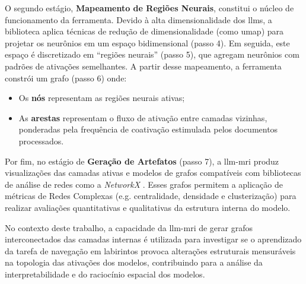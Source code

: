 O segundo estágio, \textbf{Mapeamento de Regiões Neurais}, constitui o núcleo de funcionamento da ferramenta. Devido à alta dimensionalidade dos \gls{llms}, a biblioteca aplica técnicas de redução de dimensionalidade (como \gls{umap}) para projetar os neurônios em um espaço bidimensional (passo 4). Em seguida, este espaço é discretizado em ``regiões neurais'' (passo 5), que agregam neurônios com padrões de ativações semelhantes. A partir desse mapeamento, a ferramenta constrói um grafo (passo 6) onde:

\begin{itemize}
    \item Os \textbf{nós} representam as regiões neurais ativas;
    \item As \textbf{arestas} representam o fluxo de ativação entre camadas vizinhas, ponderadas pela frequência de coativação estimulada pelos documentos processados.
\end{itemize}

Por fim, no estágio de \textbf{Geração de Artefatos} (passo 7), a \gls{llm-mri} produz visualizações das camadas ativas e modelos de grafos compatíveis com bibliotecas de análise de redes como a \textit{NetworkX} \cite{hagberg2008networkx}. Esses grafos permitem a aplicação de métricas de Redes Complexas (e.g. centralidade, densidade e clusterização) para realizar avaliações quantitativas e qualitativas da estrutura interna do modelo.

No contexto deste trabalho, a capacidade da \gls{llm-mri} de gerar grafos interconectados das camadas internas é utilizada para investigar se o aprendizado da tarefa de navegação em labirintos provoca alterações estruturais mensuráveis na topologia das ativações dos modelos, contribuindo para a análise da interpretabilidade e do raciocínio espacial dos modelos.
